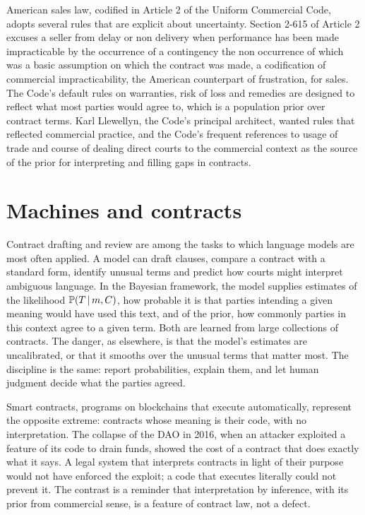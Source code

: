 American sales law, codified in Article 2 of the Uniform Commercial Code, adopts several rules that are explicit about uncertainty. Section 2-615 of Article 2 excuses a seller from delay or non delivery when performance has been made impracticable by the occurrence of a contingency the non occurrence of which was a basic assumption on which the contract was made, a codification of commercial impracticability, the American counterpart of frustration, for sales. The Code's default rules on warranties, risk of loss and remedies are designed to reflect what most parties would agree to, which is a population prior over contract terms. Karl Llewellyn, the Code's principal architect, wanted rules that reflected commercial practice, and the Code's frequent references to usage of trade and course of dealing direct courts to the commercial context as the source of the prior for interpreting and filling gaps in contracts.

\section{Machines and contracts}

Contract drafting and review are among the tasks to which language models are most often applied. A model can draft clauses, compare a contract with a standard form, identify unusual terms and predict how courts might interpret ambiguous language. In the Bayesian framework, the model supplies estimates of the likelihood $\mathbb{P}(T\,\vert\, m,C)$, how probable it is that parties intending a given meaning would have used this text, and of the prior, how commonly parties in this context agree to a given term. Both are learned from large collections of contracts. The danger, as elsewhere, is that the model's estimates are uncalibrated, or that it smooths over the unusual terms that matter most. The discipline is the same: report probabilities, explain them, and let human judgment decide what the parties agreed.

Smart contracts, programs on blockchains that execute automatically, represent the opposite extreme: contracts whose meaning is their code, with no interpretation. The collapse of the DAO in 2016, when an attacker exploited a feature of its code to drain funds, showed the cost of a contract that does exactly what it says. A legal system that interprets contracts in light of their purpose would not have enforced the exploit; a code that executes literally could not prevent it. The contrast is a reminder that interpretation by inference, with its prior from commercial sense, is a feature of contract law, not a defect.


